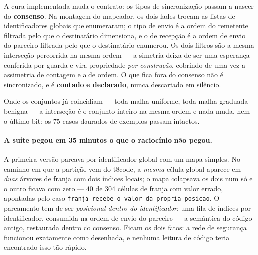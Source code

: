 A cura implementada muda o contrato: os tipos de sincronização passam a nascer
do \textbf{consenso}. Na montagem do mapeador, os dois lados trocam as listas
de identificadores globais que enumeraram; o tipo de envio é a ordem do
remetente filtrada pelo que o destinatário dimensiona, e o de recepção é a
ordem de envio do parceiro filtrada pelo que o destinatário enumerou. Os dois
filtros são a mesma interseção percorrida na mesma ordem --- a simetria deixa de
ser uma esperança conferida por guarda e vira propriedade \emph{por
construção}, cobrindo de uma vez a assimetria de contagem e a de ordem. O que
fica fora do consenso não é sincronizado, e é \textbf{contado e declarado},
nunca descartado em silêncio.

Onde os conjuntos já coincidiam --- toda malha uniforme, toda malha graduada
benigna --- a interseção é o conjunto inteiro na mesma ordem e nada muda, nem o
último bit: os $75$ casos dourados de exemplos passam intactos.

\paragraph{A suíte pegou em 35 minutos o que o raciocínio não pegou.} A
primeira versão pareava por identificador global com um mapa simples. No
caminho em que a partição vem do t8code, a \emph{mesma} célula global aparece em
\emph{duas} árvores de franja com dois índices locais; o mapa colapsava os dois
num só e o outro ficava com zero --- $40$ de $304$ células de franja com valor
errado, apontadas pelo caso \texttt{franja\_recebe\_o\_valor\_da\_propria\_posicao}.
O pareamento tem de ser \emph{posicional dentro do identificador}: uma fila de
índices por identificador, consumida na ordem de envio do parceiro --- a
semântica do código antigo, restaurada dentro do consenso. Ficam os dois fatos:
a rede de segurança funcionou exatamente como desenhada, e nenhuma leitura de
código teria encontrado isso tão rápido.
